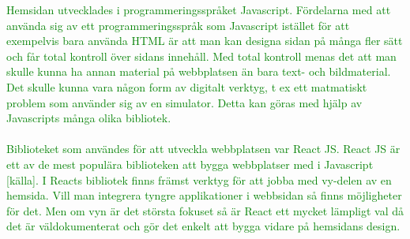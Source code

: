\textcolor{green}{Hemsidan utvecklades i programmeringsspråket Javascript. Fördelarna med att använda sig av ett programmeringsspråk som Javascript istället för att exempelvis bara använda HTML är att man kan designa sidan på många fler sätt och får total kontroll över sidans innehåll. Med total kontroll menas det att man skulle kunna ha annan material på webbplatsen än bara text- och bildmaterial. Det skulle kunna vara någon form av digitalt verktyg, t ex ett matmatiskt problem som använder sig av en simulator. Detta kan göras med hjälp av Javascripts många olika bibliotek.}
\\ \\
\textcolor{green}{Biblioteket som användes för att utveckla webbplatsen var React JS. React JS är ett av de mest populära biblioteken att bygga webbplatser med i Javascript [källa]. I Reacts bibliotek finns främst verktyg för att jobba med vy-delen av en hemsida. Vill man integrera tyngre applikationer i webbsidan så finns möjligheter för det. Men om vyn är det största fokuset så är React ett mycket lämpligt val då det är väldokumenterat och gör det enkelt att bygga vidare på hemsidans design.}
